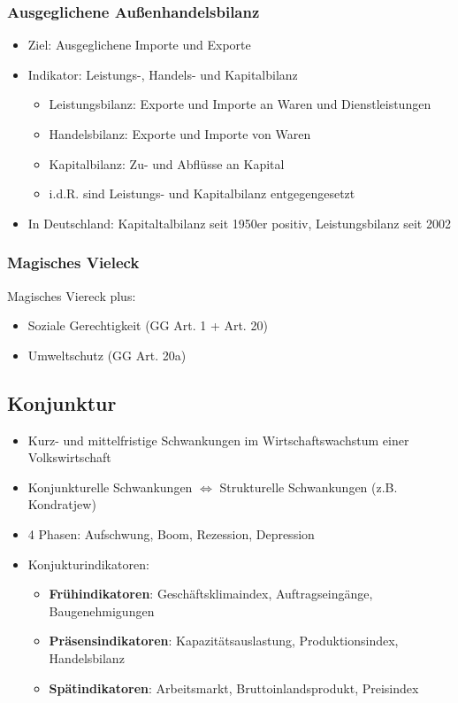 \documentclass[titlepage,parskip=half]{scrartcl}
\begin{document}
\subsubsection{Ausgeglichene Außenhandelsbilanz}
\begin{itemize}
    \item Ziel: Ausgeglichene Importe und Exporte
    \item Indikator: Leistungs-, Handels- und Kapitalbilanz
    \begin{itemize}
        \item Leistungsbilanz: Exporte und Importe an Waren und Dienstleistungen 
        \item Handelsbilanz: Exporte und Importe von Waren
        \item Kapitalbilanz: Zu- und Abflüsse an Kapital
        \item i.d.R. sind Leistungs- und Kapitalbilanz entgegengesetzt
    \end{itemize}
    \item In Deutschland: Kapitaltalbilanz seit 1950er positiv, Leistungsbilanz seit 2002
\end{itemize}

\subsubsection{Magisches Vieleck}
Magisches Viereck plus:
\begin{itemize}
    \item Soziale Gerechtigkeit (GG Art. 1 + Art. 20)
    \item Umweltschutz (GG Art. 20a)
\end{itemize}

\subsection{Konjunktur}
\begin{itemize}
    \item Kurz- und mittelfristige Schwankungen im Wirtschaftswachstum einer Volkswirtschaft
    \item Konjunkturelle Schwankungen $\Leftrightarrow$ Strukturelle Schwankungen (z.B. Kondratjew)
    \item 4 Phasen: Aufschwung, Boom, Rezession, Depression
    \item Konjukturindikatoren:
    \begin{itemize}
        \item \textbf{Frühindikatoren}: Geschäftsklimaindex, Auftragseingänge, Baugenehmigungen
        \item \textbf{Präsensindikatoren}: Kapazitätsauslastung, Produktionsindex, Handelsbilanz
        \item \textbf{Spätindikatoren}: Arbeitsmarkt, Bruttoinlandsprodukt, Preisindex
    \end{itemize}
\end{itemize}
\end{document}
